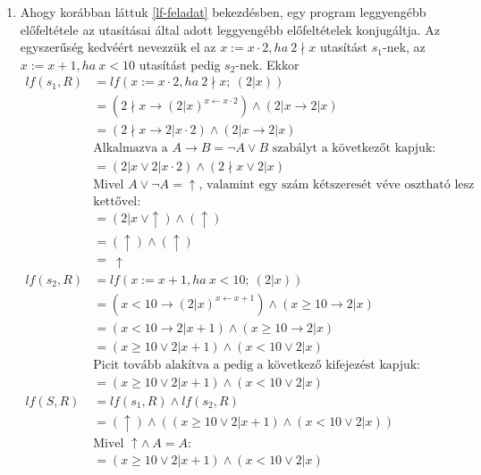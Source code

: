 \documentclass[12pt]{article}
\begin{document}
	\begin{enumerate}
		\item Ahogy korábban láttuk \ref{lf-feladat} bekezdésben, egy program leggyengébb előfeltétele az utasításai által adott leggyengébb előfeltételek konjugáltja. Az egyszerűség kedvéért nevezzük el az $x := x \cdot 2, ha\ 2 \nmid x$ utasítást $s_1$-nek, az $x := x + 1, ha\ x < 10$ utasítást pedig $s_2$-nek. Ekkor 
			\begin{align*}
				lf(s_1, R) &= lf(x := x \cdot 2, ha\ 2 \nmid x;\ (2 | x)) \\
					&= (2 \nmid x \rightarrow (2 | x)^{x \leftarrow x \cdot 2}) \land (2 | x \rightarrow 2 | x) \\
					&= (2 \nmid x \rightarrow 2 | x \cdot 2) \land (2 | x \rightarrow 2 | x) \\
					&\text{Alkalmazva a } A \rightarrow B = \neg A \lor B \text{ szabályt a következőt kapjuk:} \\
					&= (2 | x \lor 2 | x \cdot 2) \land (2 \nmid x \lor 2 | x) \\
					&\text{Mivel } A \lor \neg A = \uparrow \text{, valamint egy szám kétszeresét véve osztható lesz} \\
					&\text{kettővel:} \\
					&= (2 | x\ \lor \uparrow) \land (\uparrow) \\
					&= (\uparrow) \land (\uparrow) \\
					&=\ \uparrow \\
				lf(s_2, R) &= lf(x := x + 1, ha\ x < 10;\ (2 | x)) \\
					&= (x < 10 \rightarrow (2 | x)^{x \leftarrow x + 1}) \land (x \ge 10 \rightarrow 2 | x) \\
					&= (x < 10 \rightarrow 2 | x + 1) \land (x \ge 10 \rightarrow 2 | x) \\
					&= (x \ge 10 \lor 2 | x + 1) \land (x < 10 \lor 2 | x) \\
					&\text{Picit tovább alakítva a pedig a következő kifejezést kapjuk:} \\
					&= (x \ge 10 \lor 2 | x + 1) \land (x < 10 \lor 2 | x) \\
				lf(S, R) &= lf(s_1, R) \land lf(s_2, R) \\
					&= (\uparrow) \land ((x \ge 10 \lor 2 | x + 1) \land (x < 10 \lor 2 | x)) \\
					&\text{Mivel } \uparrow \land\ A = A: \\
					&= (x \ge 10 \lor 2 | x + 1) \land (x < 10 \lor 2 | x)
			\end{align*}

\end{enumerate}
\end{document}
